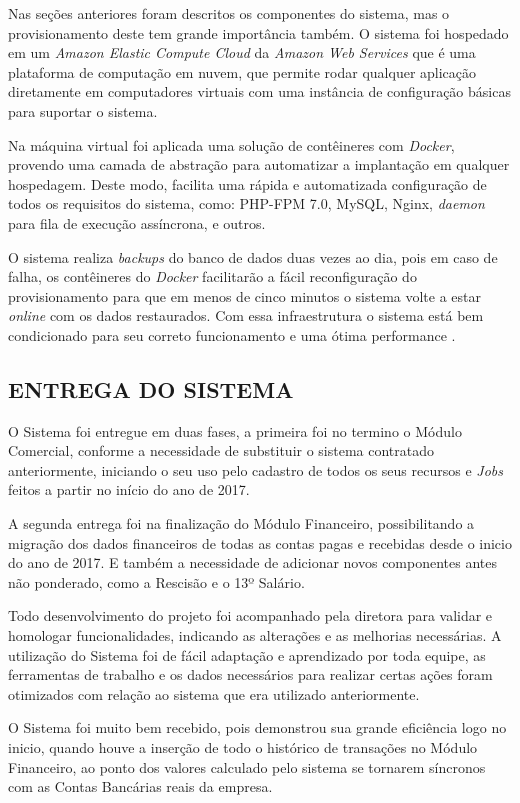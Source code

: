 \documentclass[
  12pt,				%
  openany,
  oneside,
  a4paper,			%
  english,			%
  brazil
]{article}
\numberwithin{figure}{section}
\numberwithin{table}{section}
\begin{document}
Nas seções anteriores foram descritos os componentes do sistema, mas o provisionamento deste tem grande importância também. O sistema foi hospedado em um \textit{Amazon Elastic Compute Cloud} da \textit{Amazon Web Services} que é uma plataforma de computação em nuvem, que permite rodar qualquer aplicação diretamente em computadores virtuais com uma instância de configuração básicas para suportar o sistema.

Na máquina virtual foi aplicada uma solução de contêineres com \textit{Docker}, provendo uma camada de abstração para automatizar a implantação em qualquer hospedagem. Deste modo, facilita uma rápida e automatizada configuração de todos os requisitos do sistema, como: PHP-FPM 7.0, MySQL, Nginx, \textit{daemon} para fila de execução assíncrona, e outros.

O sistema realiza \textit{backups} do banco de dados duas vezes ao dia, pois em caso de falha, os contêineres do \textit{Docker} facilitarão a fácil reconfiguração do provisionamento para que em menos de cinco minutos o sistema volte a estar \textit{online} com os dados restaurados. Com essa infraestrutura o sistema está bem condicionado para seu correto funcionamento e uma ótima performance .


\subsection{ENTREGA DO SISTEMA}

O Sistema foi entregue em duas fases, a primeira foi no termino o Módulo Comercial, conforme a necessidade de substituir o sistema contratado anteriormente, iniciando o seu uso pelo cadastro de todos os seus recursos e \textit{Jobs} feitos a partir no início do ano de 2017.

A segunda entrega foi na finalização do Módulo Financeiro, possibilitando a migração dos dados financeiros de todas as contas pagas e recebidas desde o inicio do ano de 2017. E também a necessidade de adicionar novos componentes antes não ponderado, como a Rescisão e o 13º Salário. 

Todo desenvolvimento do projeto foi acompanhado pela diretora para validar e homologar funcionalidades, indicando as alterações e as melhorias necessárias. A utilização do Sistema foi de fácil adaptação e aprendizado por toda equipe, as ferramentas de trabalho e os dados necessários para realizar certas ações foram otimizados com relação ao sistema que era utilizado anteriormente.

O Sistema foi muito bem recebido, pois demonstrou sua grande eficiência logo no inicio, quando houve a inserção de todo o histórico de transações no Módulo Financeiro, ao ponto dos valores calculado pelo sistema se tornarem síncronos com as Contas Bancárias reais da empresa.
\end{document}
